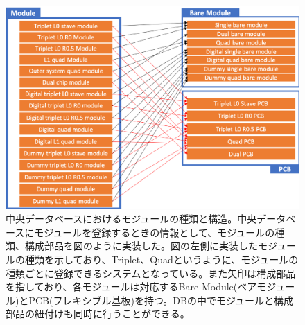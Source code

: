 
\begin{figure}[b]\centering
\includegraphics[width=12cm]{./pd_module_structure.png}
\caption[中央データベースにおけるモジュールの種類と構造]{中央データベースにおけるモジュールの種類と構造。中央データベースにモジュールを登録するときの情報として、モジュールの種類、構成部品を図のように実装した。図の左側に実装したモジュールの種類を示しており、Triplet、Quadというように、モジュールの種類ごとに登録できるシステムとなっている。また矢印は構成部品を指しており、各モジュールは対応するBare Module(ベアモジュール)とPCB(フレキシブル基板)を持つ。DBの中でモジュールと構成部品の紐付けも同時に行うことができる。}
\label{pd_module_structure}
\end{figure}

